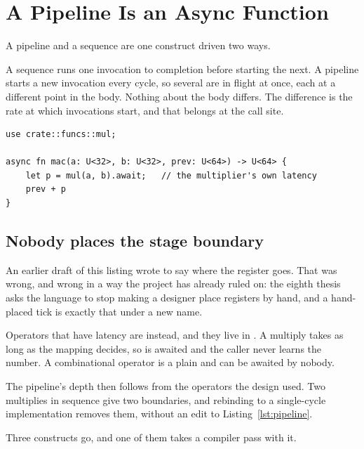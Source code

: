 \section{A Pipeline Is an Async Function}
\label{sec:e-pipeline}

A pipeline and a sequence are one construct driven two ways.

A sequence runs one invocation to completion before starting the next. A
pipeline starts a new invocation every cycle, so several are in flight at
once, each at a different point in the body. Nothing about the body
differs. The difference is the rate at which invocations start, and that
belongs at the call site.

\begin{lstlisting}[caption={A pipeline, a sequence and a parallel process, all at once. Nobody placed the stage boundary: it is where an operator with latency is awaited.},label={lst:pipeline}]
use crate::funcs::mul;

async fn mac(a: U<32>, b: U<32>, prev: U<64>) -> U<64> {
    let p = mul(a, b).await;   // the multiplier's own latency
    prev + p
}
\end{lstlisting}

\subsection{Nobody places the stage boundary}

An earlier draft of this listing wrote  to say where
the register goes. That was wrong, and wrong in a way the project has
already ruled on: the eighth thesis~\cite{theses} asks the language to
stop making a designer place registers by hand, and a hand-placed tick is
exactly that under a new name.

Operators that have latency are  instead, and they live in
. A multiply takes as long as the mapping decides, so
 is awaited and the caller never learns the number. A
combinational operator is a plain  and can be awaited by nobody.

The pipeline's depth then follows from the operators the design used. Two
multiplies in sequence give two boundaries, and rebinding  to a
single-cycle implementation removes them, without an edit to
Listing~\ref{lst:pipeline}.

Three constructs go, and one of them takes a compiler pass with it.

